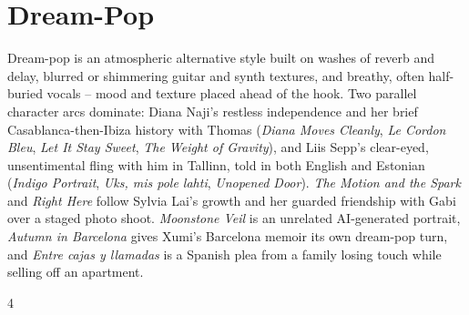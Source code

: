 \documentclass[a4paper,landscape]{memoir}
\begin{document}
\chapter{Dream-Pop}
Dream-pop is an atmospheric alternative style built on washes of reverb and delay, blurred or shimmering guitar and synth textures, and breathy, often half-buried vocals -- mood and texture placed ahead of the hook. Two parallel character arcs dominate: Diana Naji's restless independence and her brief Casablanca-then-Ibiza history with Thomas (\emph{Diana Moves Cleanly}, \emph{Le Cordon Bleu}, \emph{Let It Stay Sweet}, \emph{The Weight of Gravity}), and Liis Sepp's clear-eyed, unsentimental fling with him in Tallinn, told in both English and Estonian (\emph{Indigo Portrait}, \emph{Uks, mis pole lahti}, \emph{Unopened Door}). \emph{The Motion and the Spark} and \emph{Right Here} follow Sylvia Lai's growth and her guarded friendship with Gabi over a staged photo shoot. \emph{Moonstone Veil} is an unrelated AI-generated portrait, \emph{Autumn in Barcelona} gives Xumi’s Barcelona memoir its own dream-pop turn, and \emph{Entre cajas y llamadas} is a Spanish plea from a family losing touch while selling off an apartment.
\clearpage\begin{multicols*}{4}
\end{multicols*}
\end{document}
